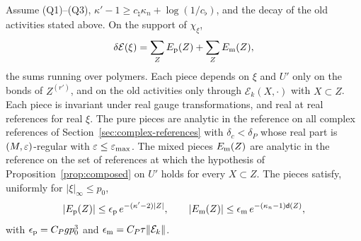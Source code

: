 \begin{proposition}\label{prop:localized-pieces}
Assume (Q1)--(Q3), $\kappa'-1\ge c_\natural\kappa_n+\log(1/c_\flat)$, and the decay of the old activities stated above. On the support of $\chi_\xi$,
\[
\delta\mathcal E(\xi)=\sum_ZE_{\rm p}(Z)+\sum_ZE_{\rm m}(Z),
\]
the sums running over polymers. Each piece depends on $\xi$ and $U'$ only on the bonds of $Z^{(r')}$, and on the old activities only through $\mathcal E_k(X,\cdot)$ with $X\subset Z$. Each piece is invariant under real gauge transformations, and real at real references for real $\xi$. The pure pieces are analytic in the reference on all complex references of Section~\ref{sec:complex-references} with $\delta_c<\delta_P$ whose real part is $(M,\varepsilon)$-regular with $\varepsilon\le\varepsilon_{\max}$. The mixed pieces $E_{\rm m}(Z)$ are analytic in the reference on the set of references at which the hypothesis of Proposition~\ref{prop:composed} on $U'$ holds for every $X\subset Z$. The pieces satisfy, uniformly for $|\xi|_\infty\le p_0$,
\[
|E_{\rm p}(Z)|\le\epsilon_{\rm p}\,e^{-(\kappa'-2)|Z|},\qquad|E_{\rm m}(Z)|\le\epsilon_{\rm m}\,e^{-(\kappa_n-1)\mathsf d(Z)},
\]
with $\epsilon_{\rm p}=C_Pgp_0^3$ and $\epsilon_{\rm m}=C_P\tau\|\mathcal E_k\|$.
\end{proposition}


